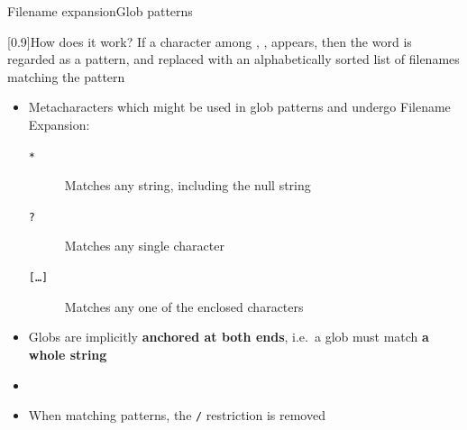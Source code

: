 \begin{frame}{Filename expansion}{Glob patterns}
    \begin{varblock}{}[0.9\textwidth]{How does it work?}
        If a character among \PB{\texttt{*}}, , \PB{\texttt{[}} appears, then the word is regarded as a pattern, and replaced with an alphabetically sorted list of filenames matching the pattern
    \end{varblock}
    \begin{itemize}
        \item Metacharacters which might be used in glob patterns and undergo Filename Expansion:
              \begin{description}
                  \item[\texttt{*}]
                      Matches any string, including the null string
                  \item[\texttt{?}]
                      Matches any single character
                  \item[\texttt{[\ldots]}]
                      Matches any one of the enclosed characters
              \end{description}
        \item Globs are implicitly \textbf{anchored at both ends}, i.e.\ \alert{a glob must match \textbf{a whole string}}
        \item {}
        \item When matching patterns, the \texttt{/} restriction is removed
    \end{itemize}
    \PrepareURLsymbol[PB]
\end{frame}

